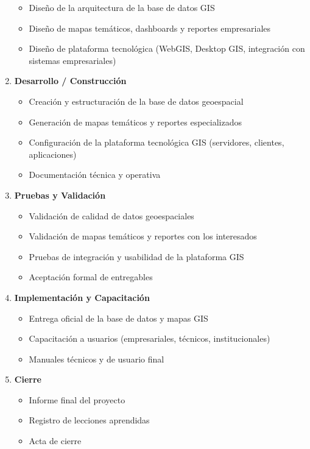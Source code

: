 \begin{multicols}{2}
\begin{enumerate}
\begin{itemize}
    \item Diseño de la arquitectura de la base de datos GIS
    \item Diseño de mapas temáticos, dashboards y reportes empresariales
    \item Diseño de plataforma tecnológica (WebGIS, Desktop GIS, integración con sistemas empresariales)
  \end{itemize}
  \item \textbf{Desarrollo / Construcción}
  \begin{itemize}
    \item Creación y estructuración de la base de datos geoespacial
    \item Generación de mapas temáticos y reportes especializados
    \item Configuración de la plataforma tecnológica GIS (servidores, clientes, aplicaciones)
    \item Documentación técnica y operativa
  \end{itemize}
  \item \textbf{Pruebas y Validación}
  \begin{itemize}
    \item Validación de calidad de datos geoespaciales
    \item Validación de mapas temáticos y reportes con los interesados
    \item Pruebas de integración y usabilidad de la plataforma GIS
    \item Aceptación formal de entregables
  \end{itemize}
  \item \textbf{Implementación y Capacitación}
  \begin{itemize}
    \item Entrega oficial de la base de datos y mapas GIS
    \item Capacitación a usuarios (empresariales, técnicos, institucionales)
    \item Manuales técnicos y de usuario final
  \end{itemize}
  \item \textbf{Cierre}
  \begin{itemize}
    \item Informe final del proyecto
    \item Registro de lecciones aprendidas
    \item Acta de cierre
  \end{itemize}
\end{enumerate}


\end{multicols}
